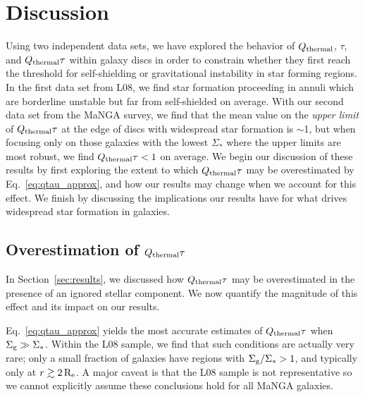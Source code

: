 \documentclass[fleqn,usenatbib]{mnras}
\newcommand{\qh}{Q_{\rm thermal}}
\begin{document}
{\section{Discussion} \label{sec:discussion}

Using two independent data sets, we have explored the behavior of $\qh$, $\tau$, and $\qh\tau$ within galaxy discs in order to constrain whether they first reach the threshold for self-shielding or gravitational instability in star forming regions.  In the first data set from L08, we find star formation proceeding in annuli which are borderline unstable but far from self-shielded on average. With our second data set from the MaNGA survey, we find that the mean value on the {\it upper limit} of $\qh\tau$ at the edge of discs with widespread star formation is $\sim$1, but when focusing only on those galaxies with the lowest $\Sigma_*$ where the upper limits are most robust, we find $\qh\tau<1$ on average.  We begin our discussion of these results by first exploring the extent to which $\qh\tau$ may be overestimated by Eq.~\ref{eq:qtau_approx}, and how our results may change when we account for this effect.  We finish by discussing the implications our results have for what drives widespread star formation in galaxies.

\subsection{Overestimation of $\qh\tau$}
\label{sec:qtau_overest}

In Section~\ref{sec:results}, we discussed how $\qh\tau$ may be overestimated in the presence of an ignored stellar component. We now quantify the magnitude of this effect and its impact on our results. 

Eq.~\ref{eq:qtau_approx} yields the most accurate estimates of $\qh\tau$ when $\Sigma_{\rm g} \gg \Sigma_*$. Within the L08 sample, we find that such conditions are actually very rare; only a small fraction of galaxies have regions with $\Sigma_{\rm g}/\Sigma_* > 1$, and typically only at $r \gtrsim 2\,{\rm R_e}$.  A major caveat is that the L08 sample is not representative so we cannot explicitly assume these conclusions hold for all MaNGA galaxies.

}
\end{document}

